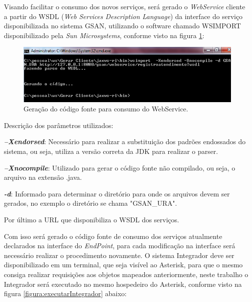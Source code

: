 Visando facilitar o consumo dos novos serviços, será gerado o \textit{WebService} cliente a partir do WSDL (\textit{Web Services Description Language}) da interface do serviço disponibilizada no sistema GSAN, utilizando o software chamado WSIMPORT disponibilizado pela \textit{Sun Microsystems}, conforme visto na figura \ref{figura:gerarWSCliente}:

\begin{figure}[!htb]
	\centering
	\caption{Geração do código fonte para consumo do WebService.}	
	\label{figura:gerarWSCliente}
	\includegraphics{figuras/gerar_wscliente.png}
\end{figure}

Descrição dos parâmetros utilizados:

\begin{description}
	\item \textbf{\textit{–Xendorsed}}: Necessário para realizar a substituição dos padrões endossados do sistema, ou seja, utiliza a versão correta da JDK para realizar o parser.
	\item \textbf{\textit{–Xnocompile}}: Utilizado para gerar o código fonte não compilado, ou seja, o arquivo na extensão .java.
	\item \textbf{\textit{-d}}: Informado para determinar o diretório para onde os arquivos devem ser gerados, no exemplo o diretório se chama "GSAN\_URA".
	\item Por último a URL que disponibiliza o WSDL dos serviços. 
\end{description}



Com isso será gerado o código fonte de consumo dos serviços atualmente declarados na interface do \textit{EndPoint}, para cada modificação na interface será necessário realizar o procedimento novamente. O sistema Integrador deve ser disponibilizado em um terminal, que seja visível ao Asterisk, para que o mesmo consiga realizar requisições aos objetos mapeados anteriormente, neste trabalho o Integrador será executado no mesmo hospedeiro do Asterisk, conforme visto na figura \ref{figura:executarIntegrador} abaixo:

